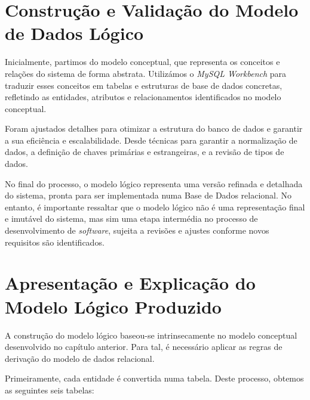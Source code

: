 \documentclass[a4paper,12pt]{scrreprt}
\begin{document}
    \section{Construção e Validação do Modelo de Dados Lógico}

               Inicialmente, partimos do modelo conceptual, que representa os conceitos e relações do sistema de forma abstrata. Utilizámos o \textit{MySQL Workbench} para traduzir esses conceitos em tabelas e estruturas de base de dados concretas, refletindo as entidades, atributos e relacionamentos identificados no modelo conceptual.

        Foram ajustados detalhes para otimizar a estrutura do banco de dados e garantir a sua eficiência e escalabilidade. Desde técnicas para garantir a normalização de dados, a definição de chaves primárias e estrangeiras, e a revisão de tipos de dados.
    
        No final do processo, o modelo lógico representa uma versão refinada e detalhada do sistema, pronta para ser implementada numa Base de Dados relacional. No entanto, é importante ressaltar que o modelo lógico não é uma representação final e imutável do sistema, mas sim uma etapa intermédia no processo de desenvolvimento de \textit{software}, sujeita a revisões e ajustes conforme novos requisitos são identificados.
        
    \clearpage
        
    \section{Apresentação e Explicação do Modelo Lógico Produzido}
        
        A construção do modelo lógico baseou-se intrinsecamente no modelo conceptual desenvolvido no capítulo anterior. Para tal, é necessário aplicar as regras de derivação do modelo de dados relacional.

        Primeiramente, cada entidade é convertida numa tabela. Deste processo, obtemos as seguintes seis tabelas:
\end{document}

